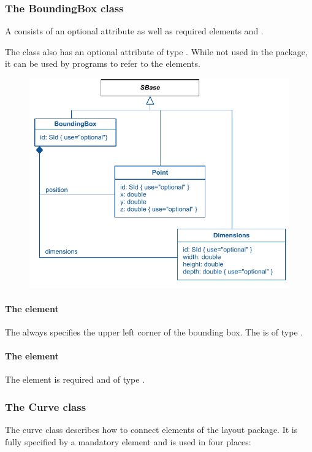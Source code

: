  \subsubsection{The BoundingBox class} \label{boundingbox-class} A 
\BoundingBox consists of an optional attribute  as well as 
required elements  and . 

The \BoundingBox class also has an optional attribute  of type 
. While not used in the \Layout package, it can be used by programs to refer to the elements. 

\begin{figure}[!h]
\includegraphics{uml/layout-boundingbox-uml}\\
\label{uml:boundingbox}
\end{figure}

\paragraph{The  element} The  always 
specifies the upper left corner of the bounding box. The 
 is of type \Point. 

\paragraph{The  element} The  
element is required and of type \Dimensions. 

\subsubsection{The Curve class } \label{curve-class} The curve class 
describes how to connect elements of the layout package. It is fully 
specified by a mandatory  element and is used 
in four places: 

